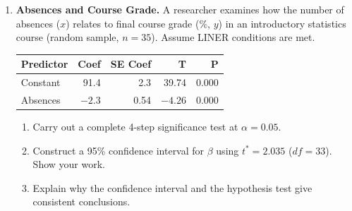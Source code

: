 \documentclass[10pt]{article}
\begin{document}
\begin{enumerate}
  \item \textbf{Absences and Course Grade.} A researcher examines how the number of absences
        ($x$) relates to final course grade ($\%$, $y$) in an introductory statistics course
        (random sample, $n = 35$). Assume LINER conditions are met.

        \begin{center}
        \renewcommand{\arraystretch}{1.4}
        \begin{tabular}{lrrrr}
            \textbf{Predictor} & \textbf{Coef} & \textbf{SE Coef} & \textbf{T} & \textbf{P} \\
            \hline
            Constant  & 91.4 & 2.3  & 39.74 & 0.000 \\
            Absences  & $-2.3$ & 0.54 & $-4.26$ & 0.000 \\
        \end{tabular}
        \end{center}

        \begin{enumerate}[label=\alph*.]
          \item Carry out a complete 4-step significance test at $\alpha = 0.05$.

          \item Construct a 95\% confidence interval for $\beta$ using $t^* = 2.035$
                ($df = 33$). Show your work.

          \item Explain why the confidence interval and the hypothesis test give
                consistent conclusions.
        \end{enumerate}

\end{enumerate}
\end{document}
